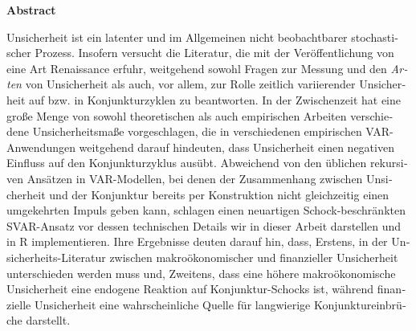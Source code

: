 \documentclass[a4paper,11pt,listof=nochaptergap,oneside,pointednumbers,bibtotoc,bigheadings,liststotoc,hidelinks]{scrbook}
\makeatletter
\theoremstyle{mysatz}
\theoremstyle{mydefinition}
\theoremstyle{mytheorem}
\theoremstyle{mybemerkung}
\newcommand\abstractname{Abstract}  %
\newenvironment{abstract}{%
      \titlepage
      \null\vfil
      \@beginparpenalty\@lowpenalty
      \begin{center}%
        \bfseries \abstractname
        \@endparpenalty\@M
      \end{center}}%
     {\par\vfil\null\endtitlepage}
\newenvironment{abstract}{%
      \if@twocolumn
        \section*{\abstractname}%
      \else
        \small
        \begin{center}%
          {\bfseries \abstractname\vspace{-.5em}\vspace{\z@}}%
        \end{center}%
        \quotation
      \fi}
      {\if@twocolumn\else\endquotation\fi}
\makeatother
\begin{document}
\begin{otherlanguage}{ngerman}
\begin{abstract}
Unsicherheit ist ein latenter und im Allgemeinen nicht beobachtbarer stochastischer Prozess. Insofern versucht die Literatur, die mit der Veröffentlichung von \citet{bloom:09} eine Art Renaissance erfuhr, weitgehend sowohl Fragen zur Messung und den \textit{Arten} von Unsicherheit als auch, vor allem, zur Rolle zeitlich variierender Unsicherheit auf bzw. in Konjunkturzyklen zu beantworten. In der Zwischenzeit hat eine große Menge von sowohl theoretischen als auch empirischen Arbeiten verschiedene Unsicherheitsmaße vorgeschlagen, die in verschiedenen empirischen VAR-Anwendungen weitgehend darauf hindeuten, dass Unsicherheit einen negativen Einfluss auf den Konjunkturzyklus ausübt. Abweichend von den üblichen rekursiven Ansätzen in VAR-Modellen, bei denen der Zusammenhang zwischen Unsicherheit und der Konjunktur bereits per Konstruktion nicht gleichzeitig einen umgekehrten Impuls geben kann, schlagen \citep{ludvigsonetal:18, ludvigsonetal:19} einen neuartigen Schock-beschränkten SVAR-Ansatz vor dessen technischen Details wir in dieser Arbeit darstellen und in R implementieren. Ihre Ergebnisse deuten darauf hin, dass, Erstens, in der Unsicherheits-Literatur zwischen makroökonomischer und finanzieller Unsicherheit unterschieden werden muss und, Zweitens, dass eine höhere makroökonomische Unsicherheit eine endogene Reaktion auf Konjunktur-Schocks ist, während finanzielle Unsicherheit eine wahrscheinliche Quelle für langwierige Konjunktureinbrüche darstellt.
\end{abstract}
\end{otherlanguage}






\restoregeometry

\thispagestyle{empty}
\pagestyle{fancy} %
\setcounter{page}{7} %
\tableofcontents
\newpage
\listoffigures

\newpage
\listoftables

\newpage

\end{document}
